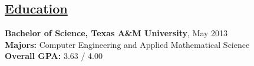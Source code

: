 \documentclass[8pt]{res}
\begin{document}
 

  \address{\bf \underline{Current Address}\\1412 Southpoint Crossing Dr.\\Durham, NC 27713}
  \address{\bf \underline{Contact Info}\\juanlb1988@gmail.com\\(254)-449-6995}

  \begin{resume}


    \section{\underline{Education}}          
    \textbf{Bachelor of Science, Texas A\&M University}, May 2013   \\       
    \textbf{Majors:} Computer Engineering and Applied Mathematical Science \\
    \textbf{Overall GPA:} 3.63 / 4.00     



\end{resume}
\end{document}

